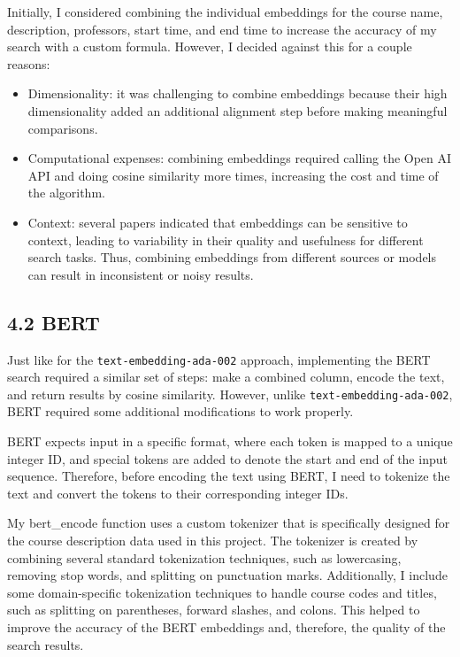 \documentclass[
	a4paper, %
	10pt, %
	unnumberedsections, %
	twoside, %
]{LTJournalArticle}
\begin{document}
Initially, I considered combining the individual embeddings for the course name, description, professors, start time, and end time to increase the accuracy of my search with a custom formula. However, I decided against this for a couple reasons: 
\begin{itemize}
	\item Dimensionality: it was challenging to combine embeddings because their high dimensionality added an additional alignment step before making meaningful comparisons.
	\item Computational expenses: combining embeddings required calling the Open AI API and doing cosine similarity more times, increasing the cost and time of the algorithm. 
	\item Context: several papers indicated that embeddings can be sensitive to context, leading to variability in their quality and usefulness for different search tasks. Thus, combining embeddings from different sources or models can result in inconsistent or noisy results.
\end{itemize}


\subsection{4.2 BERT}

Just like for the \texttt{text-embedding-ada-002} approach, implementing the BERT search required a similar set of steps: make a combined column, encode the text, and return results by cosine similarity. However, unlike  \texttt{text-embedding-ada-002}, BERT required some additional modifications to work properly. 

BERT expects input in a specific format, where each token is mapped to a unique integer ID, and special tokens are added to denote the start and end of the input sequence. Therefore, before encoding the text using BERT, I need to tokenize the text and convert the tokens to their corresponding integer IDs.

My bert\_encode function uses a custom tokenizer that is specifically designed for the course description data used in this project. The tokenizer is created by combining several standard tokenization techniques, such as lowercasing, removing stop words, and splitting on punctuation marks. Additionally, I include some domain-specific tokenization techniques to handle course codes and titles, such as splitting on parentheses, forward slashes, and colons. This helped to improve the accuracy of the BERT embeddings and, therefore, the quality of the search results.
\end{document}
